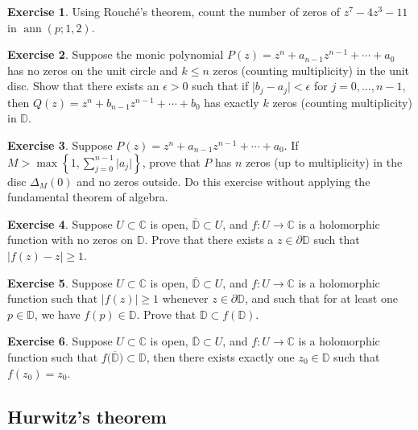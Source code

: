 \documentclass[12pt,openany]{book}
\newcommand{\ann}{\operatorname{ann}}
\newcommand{\sabs}[1]{\lvert {#1} \rvert}
\newcommand{\C}{{\mathbb{C}}}
\newcommand{\D}{{\mathbb{D}}}
\theoremstyle{plain}
\theoremstyle{remark}
\theoremstyle{definition}
\newenvironment{exbox}{%
    \def\FrameCommand{\vrule width 1pt \relax\hspace{10pt}}%
    \MakeFramed{\advance\hsize-\width\FrameRestore}%
}{%
    \endMakeFramed
}
\theoremstyle{exercise}
\newtheorem{exercise}{Exercise}[section]
\theoremstyle{example}
\begin{document}
\begin{exbox}
\begin{exercise}
Using Rouch\'e's theorem, count the number of zeros of $z^7-4z^3-11$ in $\ann(p;1,2)$.
\end{exercise}

\begin{exercise}
Suppose 
the monic polynomial
$P(z) = z^n + a_{n-1} z^{n-1} + \cdots + a_0$
has no zeros on the unit circle and $k \leq n$ zeros
(counting multiplicity)
in the unit disc.  Show that there exists an $\epsilon > 0$ such that
if $\sabs{b_j-a_j} < \epsilon$ for $j=0,\ldots,n-1$, then
$Q(z) = z^n + b_{n-1} z^{n-1} + \cdots + b_0$ has
exactly $k$ zeros (counting multiplicity) in $\D$.
\end{exercise}

\begin{exercise}
Suppose 
$P(z) = z^n + a_{n-1} z^{n-1} + \cdots + a_0$.
If $M > \max\left\{ 1, \sum_{j=0}^{n-1} \sabs{a_j} \right\}$,
prove that $P$ has $n$ zeros (up to multiplicity) in the disc $\Delta_M(0)$
and no zeros outside.  Do this exercise without applying the fundamental theorem of
algebra.
\end{exercise}

\begin{exercise}
Suppose $U \subset \C$ is open, $\overline{\D} \subset U$,
and $f \colon U \to \C$ is a holomorphic function with no zeros on
$\D$.  Prove that there exists a $z \in \partial \D$
such that $\sabs{f(z)-z} \geq 1$.
\end{exercise}

\begin{exercise}
Suppose $U \subset \C$ is open, $\overline{\D} \subset U$,
and $f \colon U \to \C$ is a holomorphic function such
that $\sabs{f(z)} \geq 1$ whenever $z \in \partial \D$,
and such that for at least one $p \in \D$, we have $f(p) \in \D$.
Prove that $\D \subset f(\D)$.
\end{exercise}

\begin{exercise}
Suppose $U \subset \C$ is open, $\overline{\D} \subset U$,
and $f \colon U \to \C$ is a holomorphic function such
that $f\bigl(\overline{\D}\bigr) \subset \D$, then there exists
exactly one $z_0 \in \D$ such that $f(z_0) = z_0$.
\end{exercise}
\end{exbox}

\subsection{Hurwitz's theorem}
\end{document}
